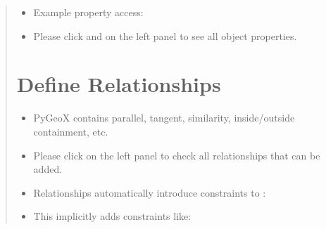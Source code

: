 \documentclass[letterpaper,10pt,english]{sphinxmanual}
\begin{document}
\begin{quote}
\begin{itemize}
\item {} 
\sphinxAtStartPar
Example property access:

\end{itemize}

\begin{sphinxVerbatim}[commandchars=\\\{\}]
  
  
  
\end{sphinxVerbatim}
\begin{itemize}
\item {} 
\sphinxAtStartPar
Please click  and  on the left panel to see all object properties.

\end{itemize}


\section{Define Relationships}
\label{\detokenize{index:define-relationships}}\begin{itemize}
\item {} 
\sphinxAtStartPar
PyGeoX contains  parallel, tangent, similarity, inside/outside containment, etc.

\item {} 
\sphinxAtStartPar
Please click  on the left panel to check all relationships that can be added.

\item {} 
\sphinxAtStartPar
Relationships automatically introduce constraints to :

\end{itemize}

\begin{sphinxVerbatim}[commandchars=\\\{\}]
 

 
\end{sphinxVerbatim}
\begin{itemize}
\item {} 
\sphinxAtStartPar
This implicitly adds constraints like:


\end{itemize}
\end{quote}
\end{document}
